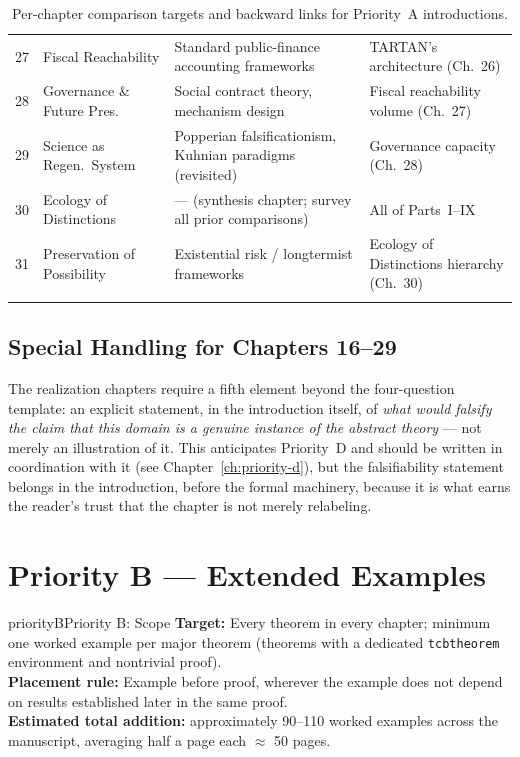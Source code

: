 \documentclass[11pt]{report}
\begin{document}
\begin{longtable}{@{}p{0.4cm}p{3.6cm}p{5.6cm}p{5.6cm}@{}}
27 & Fiscal Reachability & Standard public-finance accounting frameworks & TARTAN's architecture (Ch.~26) \\
28 & Governance \& Future Pres. & Social contract theory, mechanism design & Fiscal reachability volume (Ch.~27) \\
29 & Science as Regen.\ System & Popperian falsificationism, Kuhnian paradigms (revisited) & Governance capacity (Ch.~28) \\
30 & Ecology of Distinctions & --- (synthesis chapter; survey all prior comparisons) & All of Parts~I--IX \\
31 & Preservation of Possibility & Existential risk / longtermist frameworks & Ecology of Distinctions hierarchy (Ch.~30) \\
\bottomrule
\caption{Per-chapter comparison targets and backward links for
  Priority~A introductions.}
\label{tab:priority-a-detail}
\end{longtable}

\section{Special Handling for Chapters 16--29}

The realization chapters require a fifth element beyond the
four-question template: an explicit statement, in the
introduction itself, of \emph{what would falsify the claim that
this domain is a genuine instance of the abstract theory} ---
not merely an illustration of it. This anticipates Priority~D
and should be written in coordination with it (see
Chapter~\ref{ch:priority-d}), but the falsifiability statement
belongs in the introduction, before the formal machinery,
because it is what earns the reader's trust that the chapter is
not merely relabeling.

\chapter{Priority B --- Extended Examples}
\label{ch:priority-b}

\begin{prioritybox}{priorityB}{Priority B: Scope}
\textbf{Target:} Every theorem in every chapter; minimum one
  worked example per major theorem (theorems with a dedicated
  \texttt{tcbtheorem} environment and nontrivial proof).\\
\textbf{Placement rule:} Example before proof, wherever the
  example does not depend on results established later in the
  same proof.\\
\textbf{Estimated total addition:} approximately 90--110 worked
  examples across the manuscript, averaging half a page each
  $\approx$ 50 pages.
\end{prioritybox}
\end{document}
